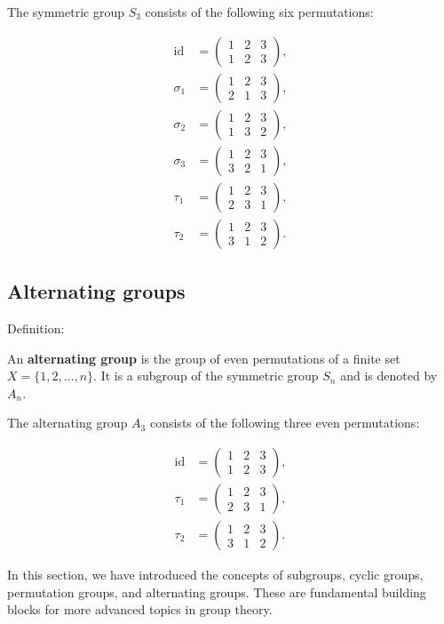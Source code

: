 \begin{example}
  The symmetric group $S_3$ consists of the following six permutations:

  \begin{align*}
    \text{id} &= \begin{pmatrix} 1 & 2 & 3 \\ 1 & 2 & 3 \end{pmatrix}, \\
    \sigma_1 &= \begin{pmatrix} 1 & 2 & 3 \\ 2 & 1 & 3 \end{pmatrix}, \\
    \sigma_2 &= \begin{pmatrix} 1 & 2 & 3 \\ 1 & 3 & 2 \end{pmatrix}, \\
    \sigma_3 &= \begin{pmatrix} 1 & 2 & 3 \\ 3 & 2 & 1 \end{pmatrix}, \\
    \tau_1 &= \begin{pmatrix} 1 & 2 & 3 \\ 2 & 3 & 1 \end{pmatrix}, \\
    \tau_2 &= \begin{pmatrix} 1 & 2 & 3 \\ 3 & 1 & 2 \end{pmatrix}.
  \end{align*}
\end{example}

\subsection{Alternating groups}

Definition:

  An \textbf{alternating group} is the group of even permutations of a finite set $X = \{1, 2, \dots, n\}$. It is a subgroup of the symmetric group $S_n$ and is denoted by $A_n$.

\begin{example}
  The alternating group $A_3$ consists of the following three even permutations:

  \begin{align*}
    \text{id} &= \begin{pmatrix} 1 & 2 & 3 \\ 1 & 2 & 3 \end{pmatrix}, \\
    \tau_1 &= \begin{pmatrix} 1 & 2 & 3 \\ 2 & 3 & 1 \end{pmatrix}, \\
    \tau_2 &= \begin{pmatrix} 1 & 2 & 3 \\ 3 & 1 & 2 \end{pmatrix}.
  \end{align*}
\end{example}

In this section, we have introduced the concepts of subgroups, cyclic groups, permutation groups, and alternating groups. These are fundamental building blocks for more advanced topics in group theory.




